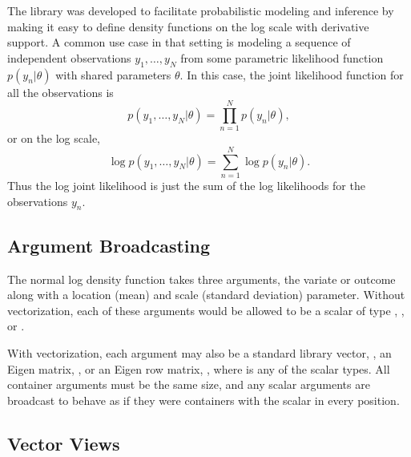 \documentclass[10pt]{article}
\begin{document}
The  library was developed to facilitate
probabilistic modeling and inference by making it easy to define
density functions on the log scale with derivative support.  A common
use case in that setting is modeling a sequence of independent
observations $y_1,\ldots,y_N$ from some parametric likelihood function
$p(y_n|\theta)$ with shared parameters $\theta$.  In this case, the
joint likelihood function for all the observations is
\[
p(y_1,\ldots,y_N|\theta) = \prod_{n=1}^N p(y_n|\theta),
\]
or on the log scale,
\[
\log p(y_1,\ldots,y_N|\theta) = \sum_{n=1}^N \log p(y_n|\theta).
\]
Thus the log joint likelihood is just the sum of the log likelihoods
for the observations $y_n$.

\subsection{Argument Broadcasting}

The normal log density function takes three arguments, the variate or
outcome along with a location (mean) and scale (standard deviation)
parameter.  Without vectorization, each of these arguments would be
allowed to be a scalar of type , , or
.  

With vectorization, each argument may also be a standard library
vector, , an Eigen matrix, ,
or an Eigen row matrix, , where  is
any of the scalar types.  All container arguments must be the same
size, and any scalar arguments are broadcast to behave as if they were
containers with the scalar in every position.

\subsection{Vector Views}
\end{document}
